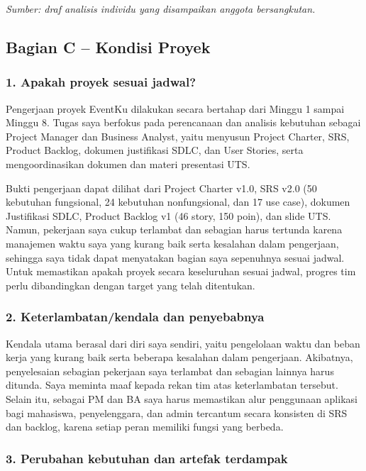 \documentclass[11pt,a4paper]{article}
\begin{document}
\textit{Sumber: draf analisis individu yang disampaikan anggota bersangkutan.} \cite{dustinind}

\subsection*{Bagian C -- Kondisi Proyek}

\subsubsection*{1. Apakah proyek sesuai jadwal?}

Pengerjaan proyek EventKu dilakukan secara bertahap dari Minggu 1 sampai Minggu 8. Tugas saya berfokus pada perencanaan dan analisis kebutuhan sebagai Project Manager dan Business Analyst, yaitu menyusun Project Charter, SRS, Product Backlog, dokumen justifikasi SDLC, dan User Stories, serta mengoordinasikan dokumen dan materi presentasi UTS.

Bukti pengerjaan dapat dilihat dari Project Charter v1.0, SRS v2.0 (50 kebutuhan fungsional, 24 kebutuhan nonfungsional, dan 17 use case), dokumen Justifikasi SDLC, Product Backlog v1 (46 story, 150 poin), dan slide UTS. Namun, pekerjaan saya cukup terlambat dan sebagian harus tertunda karena manajemen waktu saya yang kurang baik serta kesalahan dalam pengerjaan, sehingga saya tidak dapat menyatakan bagian saya sepenuhnya sesuai jadwal. Untuk memastikan apakah proyek secara keseluruhan sesuai jadwal, progres tim perlu dibandingkan dengan target yang telah ditentukan.

\subsubsection*{2. Keterlambatan/kendala dan penyebabnya}

Kendala utama berasal dari diri saya sendiri, yaitu pengelolaan waktu dan beban kerja yang kurang baik serta beberapa kesalahan dalam pengerjaan. Akibatnya, penyelesaian sebagian pekerjaan saya terlambat dan sebagian lainnya harus ditunda. Saya meminta maaf kepada rekan tim atas keterlambatan tersebut. Selain itu, sebagai PM dan BA saya harus memastikan alur penggunaan aplikasi bagi mahasiswa, penyelenggara, dan admin tercantum secara konsisten di SRS dan backlog, karena setiap peran memiliki fungsi yang berbeda.

\subsubsection*{3. Perubahan kebutuhan dan artefak terdampak}
\end{document}
